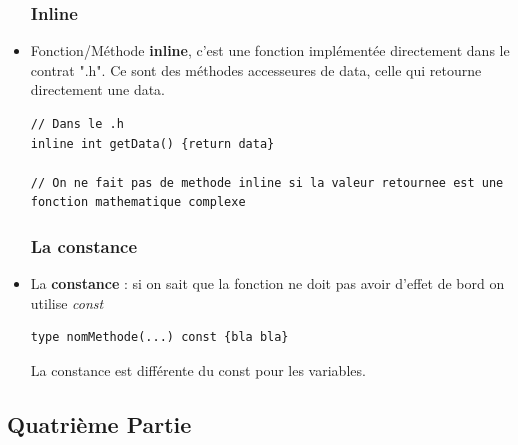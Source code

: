 \documentclass[12pt,a4paper]{article}
\begin{document}
\begin{itemize}
\subsubsection{Inline}
\item Fonction/Méthode \textbf{inline}, c'est une fonction implémentée directement dans le contrat ".h". Ce sont des méthodes accesseures de data, celle qui retourne directement une data.
\begin{lstlisting}
// Dans le .h
inline int getData() {return data}

// On ne fait pas de methode inline si la valeur retournee est une fonction mathematique complexe
\end{lstlisting}
\subsubsection{La constance}
\item La \textbf{constance} : si on sait que la fonction ne doit pas avoir d'effet de bord on utilise \textit{const}
\begin{lstlisting}
type nomMethode(...) const {bla bla}
\end{lstlisting}
La constance est différente du const pour les variables.
\end{itemize}

\subsection{Quatrième Partie}
\end{document}
